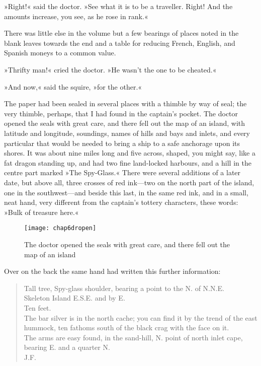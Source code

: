 »Right!« said the doctor. »See what it is to be a traveller. Right! And the amounts increase, you see, as he rose in rank.«

There was little else in the volume but a few bearings of places noted in the blank leaves towards the end and a table for reducing French, English, and Spanish moneys to a common value.

»Thrifty man!« cried the doctor. »He wasn't the one to be cheated.«

»And now,« said the squire, »for the other.«

 
The paper had been sealed in several places with a thimble by way of seal; the very thimble, perhaps, that I had found in the captain's pocket. The doctor opened the seals with great care, and there fell out the map of an island, with latitude and longitude, soundings, names of hills and bays and inlets, and every particular that would be needed to bring a ship to a safe anchorage upon its shores. It was about nine miles long and five across, shaped, you might say, like a fat dragon standing up, and had two fine land-locked harbours, and a hill in the centre part marked »The Spy-Glass.« There were several additions of a later date, but above all, three crosses of red ink—two on the north part of the island, one in the southwest—and beside this last, in the same red ink, and in a small, neat hand, very different from the captain's tottery characters, these words: »Bulk of treasure here.«


\begin{figure}[p]
\centering
\texttt{[image: chap6dropen]}
\caption[There fell out the map of an island]{The doctor opened the seals with great care, and there fell out the map of an island}
\end{figure}

Over on the back the same hand had written this further information:

\blockquote{
Tall tree, Spy-glass shoulder, bearing a point to the N. of N.N.E.\\
Skeleton Island E.S.E. and by E.\\
Ten feet.\\
The bar silver is in the north cache; you can find it by the trend of the east hummock, ten fathoms south of the black crag with the face on it.\\
The arms are easy found, in the sand-hill, N. point of north inlet cape, bearing E. and a quarter N.\\
\textsc{J.F.}}


